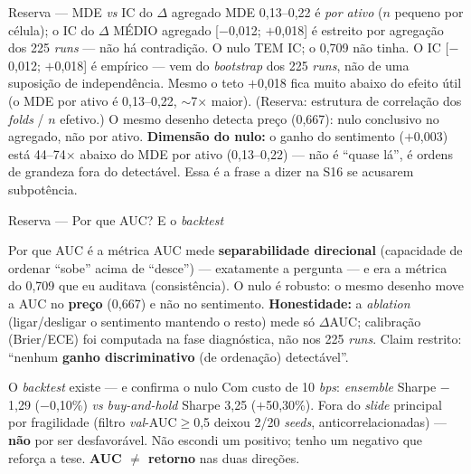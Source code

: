 \documentclass[10pt,aspectratio=169]{beamer}
\begin{document}
\begin{frame}{Reserva --- MDE \textit{vs} IC do $\Delta$ agregado}
  {\footnotesize MDE 0{,}13--0{,}22 é \textit{por ativo} ($n$ pequeno por célula); o IC do $\Delta$ MÉDIO agregado [$-$0{,}012; $+$0{,}018] é estreito por agregação dos 225 \textit{runs} --- não há contradição. O nulo TEM IC; o 0{,}709 não tinha.}
  \vspace{1ex}
  {\footnotesize O IC [$-$0{,}012; $+$0{,}018] é \alert{empírico} --- vem do \textit{bootstrap} dos 225 \textit{runs}, não de uma suposição de independência. Mesmo o teto $+$0{,}018 fica muito abaixo do efeito útil (o MDE por ativo é 0{,}13--0{,}22, $\sim$7$\times$ maior). (Reserva: estrutura de correlação dos \textit{folds} / $n$ efetivo.) O mesmo desenho \alert{detecta preço} (0{,}667): nulo conclusivo no agregado, não por ativo.}
  \vspace{1ex}
  {\footnotesize \textbf{Dimensão do nulo:} o ganho do sentimento ($+$0{,}003) está \alert{44--74$\times$ abaixo} do MDE por ativo (0{,}13--0{,}22) --- não é ``quase lá'', é ordens de grandeza fora do detectável. Essa é a frase a dizer na S16 se acusarem subpotência.}
\end{frame}

\begin{frame}{Reserva --- Por que AUC? E o \textit{backtest}}
  \begin{block}{Por que AUC é a métrica}
    {\footnotesize AUC mede \textbf{separabilidade direcional} (capacidade de ordenar ``sobe'' acima de ``desce'') --- exatamente a pergunta --- e era a métrica do 0{,}709 que eu auditava (consistência). O nulo é robusto: o mesmo desenho move a AUC no \textbf{preço} (0{,}667) e \alert{não} no sentimento. \textbf{Honestidade:} a \textit{ablation} (ligar/desligar o sentimento mantendo o resto) mede só $\Delta$AUC; calibração (Brier/ECE) foi computada na fase diagnóstica, não nos 225 \textit{runs}. Claim restrito: ``nenhum \textbf{ganho discriminativo} (de ordenação) detectável''.}
  \end{block}
  \begin{block}{O \textit{backtest} existe --- e confirma o nulo}
    {\footnotesize Com custo de 10 \textit{bps}: \textit{ensemble} Sharpe \alert{$-$1{,}29} ($-$0{,}10\%) \textit{vs} \textit{buy-and-hold} Sharpe 3{,}25 ($+$50{,}30\%). Fora do \textit{slide} principal por fragilidade (filtro \textit{val}-AUC$\geq$0{,}5 deixou 2/20 \textit{seeds}, anticorrelacionadas) --- \textbf{não} por ser desfavorável. Não escondi um positivo; tenho um negativo que \alert{reforça} a tese. \textbf{AUC $\neq$ retorno} nas duas direções.}
  \end{block}
\end{frame}
\end{document}
